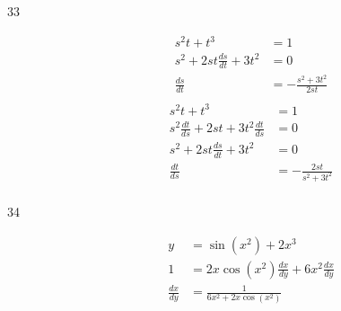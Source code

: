 \documentclass{exam}
\begin{document}
\begin{description}
\item[33]
\begin{align*}
  s^2t + t^3 &= 1 \\
  s^2 + 2 st \frac{ds}{dt} + 3t^2 &= 0 \\
  \frac{ds}{dt} &= - \frac{s^2 + 3t^2}{2st} \\
\end{align*}
\begin{align*}
  s^2t + t^3 &= 1 \\
  s^2 \frac{dt}{ds} + 2st + 3t^2 \frac{dt}{ds} &= 0 \\
  s^2 + 2 st \frac{ds}{dt} + 3t^2 &= 0 \\
  \frac{dt}{ds} &= - \frac{2st}{s^2 + 3t^2} \\
\end{align*}

\item[34]
\begin{align*}
  y &= \sin(x^2) + 2x^3 \\
  1 &= 2x \cos(x^2) \frac{dx}{dy} + 6x^2 \frac{dx}{dy} \\
  \frac{dx}{dy} &= \frac{1}{6x^2 + 2x \cos(x^2)}
\end{align*}






\end{description}
\end{document}
